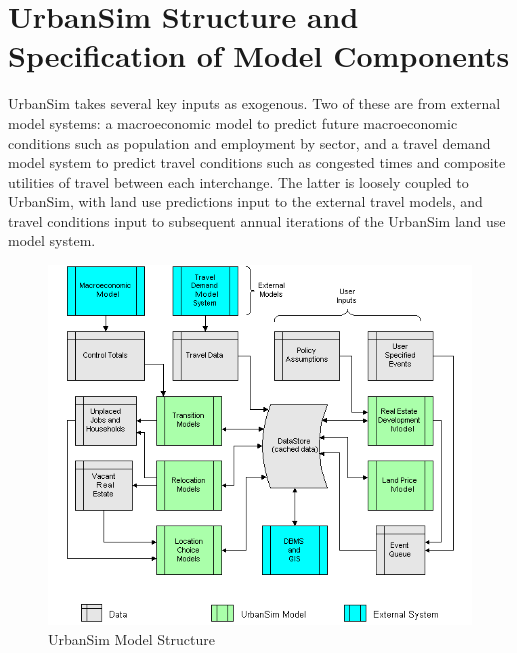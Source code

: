 
\chapter{UrbanSim Structure and Specification of Model Components}
\label{chapter:models}

UrbanSim takes several key inputs as exogenous.  Two of these are
from external model systems: a macroeconomic model to predict
future macroeconomic conditions such as population and employment
by sector, and a travel demand model system to predict travel
conditions such as congested times and composite utilities of
travel between each interchange.  The latter is loosely coupled to
UrbanSim, with land use predictions input to the external travel
models, and travel conditions input to subsequent annual
iterations of the UrbanSim land use model system.

\begin{figure}
\begin{center}
\includegraphics[width=6.5in]{images/flownew.png}
\caption{UrbanSim Model Structure} \label{figure:USStruct}
\end{center}
\end{figure}

